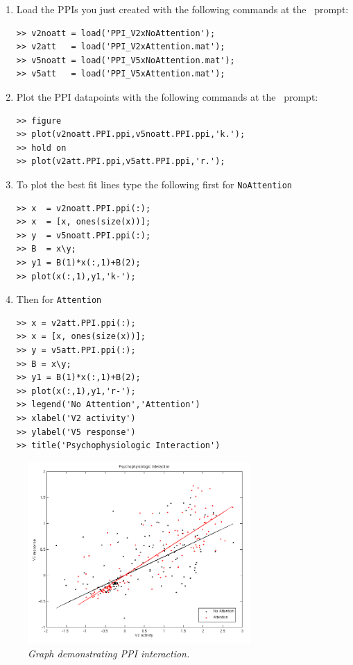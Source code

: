 \begin{enumerate}
\item Load the PPIs you just created with the following commands at the \matlab\ prompt:
\begin{verbatim}
>> v2noatt = load('PPI_V2xNoAttention');
>> v2att   = load('PPI_V2xAttention.mat');
>> v5noatt = load('PPI_V5xNoAttention.mat');
>> v5att   = load('PPI_V5xAttention.mat');
\end{verbatim}
\item Plot the PPI datapoints with the following commands at the \matlab\ prompt:
\begin{verbatim}
>> figure
>> plot(v2noatt.PPI.ppi,v5noatt.PPI.ppi,'k.');
>> hold on
>> plot(v2att.PPI.ppi,v5att.PPI.ppi,'r.');
\end{verbatim}
\item To plot the best fit lines type the following first for \texttt{NoAttention}
\begin{verbatim}
>> x  = v2noatt.PPI.ppi(:);
>> x  = [x, ones(size(x))];
>> y  = v5noatt.PPI.ppi(:);
>> B  = x\y;
>> y1 = B(1)*x(:,1)+B(2);
>> plot(x(:,1),y1,'k-');
\end{verbatim}
\item Then for \texttt{Attention}
\begin{verbatim}
>> x = v2att.PPI.ppi(:);
>> x = [x, ones(size(x))];
>> y = v5att.PPI.ppi(:);
>> B = x\y;
>> y1 = B(1)*x(:,1)+B(2);
>> plot(x(:,1),y1,'r-');
>> legend('No Attention','Attention')
>> xlabel('V2 activity')
>> ylabel('V5 response')
>> title('Psychophysiologic Interaction')
\end{verbatim}
\end{enumerate}

\begin{figure}[!ht]
\centering\includegraphics[width=85mm]{ppi/figures/Fig16.png}
\caption{\em Graph demonstrating PPI interaction.}
\label{fig:ppi16}
\end{figure}
